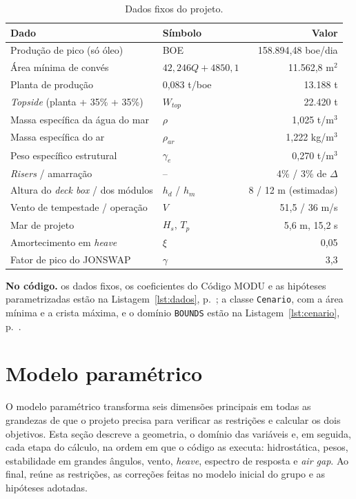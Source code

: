 \documentclass[11pt,a4paper]{article}
\newcommand{\notacodigo}[1]{\begin{nocodigo}\textbf{\sffamily\color{azul}No código.} #1\end{nocodigo}}
\newcommand{\lst}[1]{Listagem~\ref{lst:#1}, p.~\pageref{lst:#1}}
\begin{document}
\begin{table}[!htb]
\centering
\caption{Dados fixos do projeto.}\label{tab:fixos}
\begin{tabular}{llr}
\toprule
Dado & Símbolo & Valor \\
\midrule
Produção de pico (só óleo) & BOE & 158.894,48 boe/dia \\
Área mínima de convés & $42{,}246Q + 4850{,}1$ & 11.562,8 m$^2$ \\
Planta de produção & 0,083 t/boe & 13.188 t \\
\emph{Topside} (planta + 35\% + 35\%) & $W_{top}$ & 22.420 t \\
Massa específica da água do mar & $\rho$ & 1,025 t/m$^3$ \\
Massa específica do ar & $\rho_{ar}$ & 1,222 kg/m$^3$ \\
Peso específico estrutural & $\gamma_e$ & 0,270 t/m$^3$ \\
\emph{Risers} / amarração & -- & 4\% / 3\% de $\Delta$ \\
Altura do \emph{deck box} / dos módulos & $h_d$ / $h_m$ & 8 / 12 m (estimadas) \\
Vento de tempestade / operação & $V$ & 51,5 / 36 m/s \\
Mar de projeto & $H_s$, $T_p$ & 5,6 m, 15,2 s \\
Amortecimento em \emph{heave} & $\xi$ & 0,05 \\
Fator de pico do JONSWAP & $\gamma$ & 3,3 \\
\bottomrule
\end{tabular}
\end{table}

\notacodigo{os dados fixos, os coeficientes do Código MODU e as hipóteses parametrizadas estão na
\lst{dados}; a classe \texttt{Cenario}, com a área mínima e a crista máxima, e o domínio
\texttt{BOUNDS} estão na \lst{cenario}.}


\section{Modelo paramétrico}\label{sec:modelo}

O modelo paramétrico transforma seis dimensões principais em todas as grandezas de que o projeto
precisa para verificar as restrições e calcular os dois objetivos. Esta seção descreve a
geometria, o domínio das variáveis e, em seguida, cada etapa do cálculo, na ordem em que o código
as executa: hidrostática, pesos, estabilidade em grandes ângulos, vento, \emph{heave}, espectro de
resposta e \emph{air gap}. Ao final, reúne as restrições, as correções feitas no modelo inicial do
grupo e as hipóteses adotadas.
\end{document}
